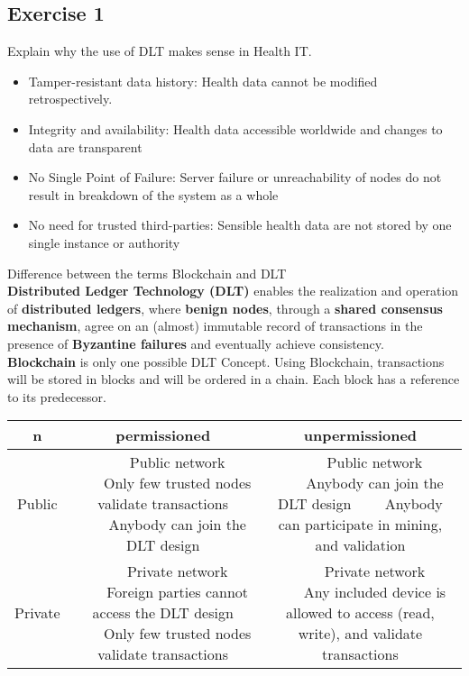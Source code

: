 \documentclass{article}
\newcommand{\tabitem}{~~\llap{\textbullet}~~}
\begin{document}
\subsection{Exercise 1}
Explain why the use of DLT makes sense in Health IT.
\begin{itemize}
    \item Tamper-resistant data history: Health data cannot be modified retrospectively.
    \item Integrity and availability: Health data accessible worldwide and changes to data are transparent
    \item No Single Point of Failure: Server failure or unreachability of nodes do not result in breakdown of the system as a whole
    \item No need for trusted third-parties: Sensible health data are not stored by one single instance or authority
\end{itemize}
Difference between the terms Blockchain and DLT\\
\textbf{Distributed Ledger Technology (DLT)} enables the realization and operation of \textbf{distributed ledgers}, where \textbf{benign nodes}, through a \textbf{shared consensus mechanism}, agree on an (almost) immutable record of transactions in the presence of \textbf{Byzantine failures} and eventually achieve consistency.\\
\newline
\textbf{Blockchain} is only one possible DLT Concept. Using Blockchain, transactions will be stored in blocks and will be ordered in a chain. Each block has a reference to its predecessor.\\
\begin{adjustbox}{width=1.5\textwidth,center=\textwidth}
    \begin{tabular}{|c|c|c|}
        n       & permissioned             & unpermissioned \\
        \hline
        Public  & \tabitem Public network
        \tabitem Only few trusted nodes validate transactions 
        \tabitem Anybody can join the DLT design
                & \tabitem Public network
        \tabitem Anybody can join the DLT design
        \tabitem Anybody can participate in mining, and validation
        \\
        \hline
        Private & \tabitem Private network
        \tabitem Foreign parties cannot access the DLT design
        \tabitem Only few trusted nodes validate transactions
                &
        \tabitem Private network
        \tabitem Any included device is allowed to access (read, write), and validate transactions
        \\
        \hline
    \end{tabular}
\end{adjustbox}
\end{document}
